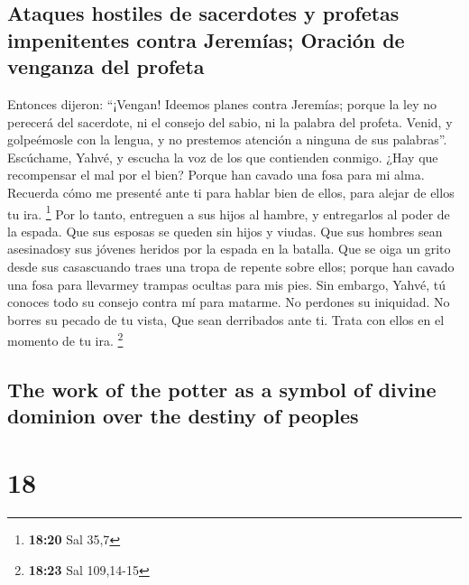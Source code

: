 \begin{paracol}{2}
\hypertarget{ataques-hostiles-de-sacerdotes-y-profetas-impenitentes-contra-jeremuxedas-oraciuxf3n-de-venganza-del-profeta}{%
\subsection{Ataques hostiles de sacerdotes y profetas impenitentes
contra Jeremías; Oración de venganza del
profeta}\label{ataques-hostiles-de-sacerdotes-y-profetas-impenitentes-contra-jeremuxedas-oraciuxf3n-de-venganza-del-profeta}}

 Entonces dijeron: ``¡Vengan! Ideemos planes contra
Jeremías; porque la ley no perecerá del sacerdote, ni el consejo del
sabio, ni la palabra del profeta. Venid, y golpeémosle con la lengua, y
no prestemos atención a ninguna de sus palabras''. 
Escúchame, Yahvé, y escucha la voz de los que contienden conmigo.
 ¿Hay que recompensar el mal por el bien? Porque han
cavado una fosa para mi alma. Recuerda cómo me presenté ante ti para
hablar bien de ellos, para alejar de ellos tu ira. \footnote{\textbf{18:20}
  Sal 35,7}  Por lo tanto, entreguen a sus hijos al
hambre, y entregarlos al poder de la espada. Que sus esposas se queden
sin hijos y viudas. Que sus hombres sean asesinadosy sus jóvenes heridos
por la espada en la batalla.  Que se oiga un grito desde
sus casascuando traes una tropa de repente sobre ellos; porque han
cavado una fosa para llevarmey trampas ocultas para mis pies.
 Sin embargo, Yahvé, tú conoces todo su consejo contra mí
para matarme. No perdones su iniquidad. No borres su pecado de tu vista,
Que sean derribados ante ti. Trata con ellos en el momento de tu ira.
\footnote{\textbf{18:23} Sal 109,14-15}

\switchcolumn
\begin{otherlanguage}{english}

\hypertarget{the-work-of-the-potter-as-a-symbol-of-divine-dominion-over-the-destiny-of-peoples}{%
\subsection{The work of the potter as a symbol of divine dominion over
the destiny of
peoples}\label{the-work-of-the-potter-as-a-symbol-of-divine-dominion-over-the-destiny-of-peoples}}

\hypertarget{section-35}{%
\section{18}\label{section-35}}


\end{otherlanguage}
\end{paracol}
